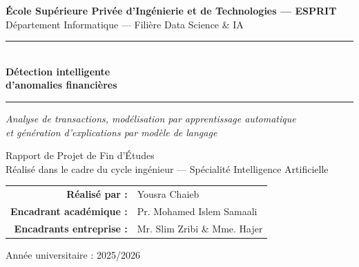 \documentclass[12pt,a4paper,twoside]{report}
\begin{document}

\begin{titlepage}
\centering

\vspace{1cm}

{\large \textbf{École Supérieure Privée d'Ingénierie et de Technologies --- ESPRIT}}\\[0.3cm]
{\large Département Informatique --- Filière Data Science \& IA}

\vspace{1.5cm}

\rule{\linewidth}{0.4pt}\\[0.4cm]
{\fontsize{24}{28}\selectfont \textbf{Détection intelligente\\[0.2cm]
d'anomalies financières}}\\[0.4cm]
\rule{\linewidth}{0.4pt}

\vspace{0.6cm}

{\large \textit{Analyse de transactions, modélisation par apprentissage automatique\\
et génération d'explications par modèle de langage}}

\vspace{1.5cm}

{\large Rapport de Projet de Fin d'Études}\\[0.2cm]
{\normalsize Réalisé dans le cadre du cycle ingénieur ---
Spécialité Intelligence Artificielle}

\vspace{1.5cm}

\begin{tabular}{rl}
  \textbf{Réalisé par :}           & Yousra Chaieb \\[0.2cm]
  \textbf{Encadrant académique :}  & Pr. Mohamed Islem Samaali \\[0.2cm]
  \textbf{Encadrants entreprise :} & Mr. Slim Zribi \& Mme. Hajer \\[0.2cm]
\end{tabular}

\vfill

{\large Année universitaire : 2025/2026}

\end{titlepage}

\clearpage
{}

\end{document}
